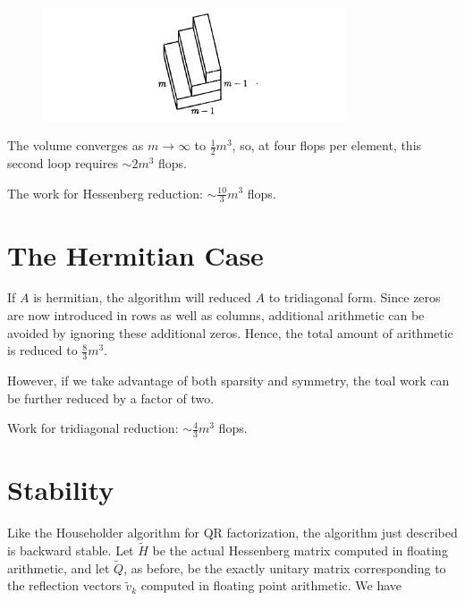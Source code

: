 \begin{figure}[H]
    \centering
    \includegraphics[width=0.8\textwidth]{figures/26-7.png}
\end{figure}
The volume converges as $m\to \infty$ to $\frac{1}{2}m^3$, so, at four flops per element, this second loop requires $\sim 2m^3$ flops. 


\begin{theorem}
\label{thm: Work Hessenberg reduction}
The work for Hessenberg reduction: $\sim \frac{10}{3} m^3$ flops. 
\end{theorem}

\section{The Hermitian Case} 
If $A$ is hermitian, the algorithm will reduced $A$ to tridiagonal form. Since zeros are now introduced in rows as well as columns, additional arithmetic can be avoided by ignoring these additional zeros. Hence, the total amount of arithmetic is reduced to $\frac{8}{3}m^3$. 

However, if we take advantage of both sparsity and symmetry, the toal work can be further reduced by a factor of two. 


\begin{theorem}
\label{thm: Work tridiagonal reduction}
Work for tridiagonal reduction: $ \sim \frac{4}{3}m^3 $ flops. 
\end{theorem}

\section{Stability}
Like the Householder algorithm for QR factorization, the algorithm just described is backward stable. Let $\tilde H$ be the actual Hessenberg matrix computed in floating arithmetic, and let $\tilde Q$, as before, be the exactly unitary matrix corresponding to the reflection vectors $\tilde v_k$ computed in floating point arithmetic. We have 


